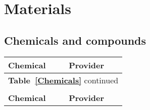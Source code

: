 
\chapter{Materials} %

\label{Materials} %



\section{Chemicals and compounds}

\begin{center}

\begin{longtable}{l l}
\textbf{Chemical} & \textbf{Provider}\\
\hline
\endfirsthead

\multicolumn{2}{l}{\textbf{Table~\ref{Chemicals}} continued}\\
\\
\textbf{Chemical} & \textbf{Provider}\\
\hline
\endhead


\end{longtable}
\end{center}
